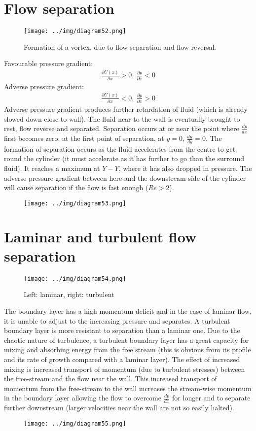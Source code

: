 \documentclass[class=report, crop=false, 12pt,a4paper]{standalone}
\begin{document}
\section{Flow separation}
\begin{figure}[H]
  \centering
  \texttt{[image: ../img/diagram52.png]}
  \caption{Formation of a vortex, due to flow separation and flow reversal.}
\end{figure}
Favourable pressure gradient:
\begin{align}
  \frac{\partial U(x)}{\partial x} > 0, \ \frac{\partial p}{\partial x} <0
\end{align}
Adverse pressure gradient:
\begin{align}
  \frac{\partial U(x)}{\partial x} < 0, \ \frac{\partial p}{\partial x} > 0
\end{align}
Adverse pressure gradient produces further retardation of fluid (which is already slowed down close to wall). The fluid near to the wall is eventually brought to rest, flow reverse and separated. Separation occurs at or near the point where $\frac{dp}{dx}$ first becomes zero; at the first point of separation, at $y = 0$, $\frac{du}{dy} =0$. The formation of separation occurs as the fluid accelerates from the centre to get round the cylinder (it must accelerate as it has further to go than the surround fluid). It reaches a maximum at $Y-Y$, where it has also dropped in pressure. The adverse pressure gradient between here and the downstream side of the cylinder will cause separation if the flow is fast enough ($Re > 2$).
\begin{figure}[H]
  \centering
  \texttt{[image: ../img/diagram53.png]}
\end{figure}
\section{Laminar and turbulent flow separation}
\begin{figure}[H]
  \centering
  \texttt{[image: ../img/diagram54.png]}
  \caption{Left: laminar, right: turbulent}
\end{figure}
The boundary layer has a high momentum deficit and in the case of laminar flow, it is unable to adjust to the increasing pressure and separates. A turbulent boundary layer is more resistant to separation than a laminar one. Due to the chaotic nature of turbulence, a turbulent boundary layer has a great capacity for mixing and absorbing energy from the free stream (this is obvious from its profile and its rate of growth compared with a laminar layer). The effect of increased mixing is increased transport of momentum (due to turbulent stresses) between the free-stream and the flow near the wall. This increased transport of momentum from the free-stream to the wall increases the stream-wise momentum in the boundary layer allowing the flow to overcome $\frac{dp}{dx}$ for longer and to separate further downstream (larger velocities near the wall are not so easily halted). 
\begin{figure}[H]
  \centering
  \texttt{[image: ../img/diagram55.png]}
\end{figure}
\end{document}
